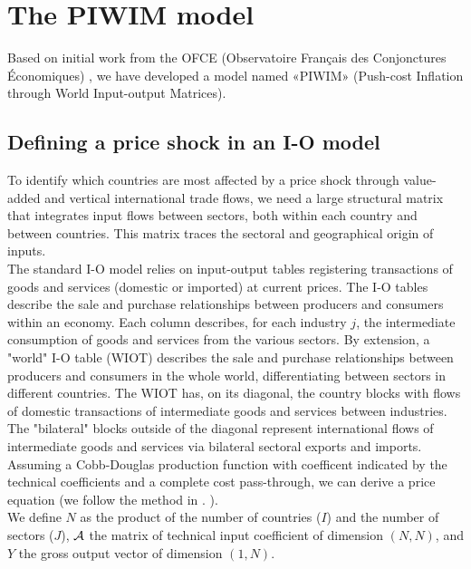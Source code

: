 \documentclass[11pt,a4paper]{article}
\begin{document}
\section{The PIWIM model }
\label{sec:metho}

Based on initial work from the OFCE (Observatoire Français des Conjonctures Économiques) \cite{Cochard2016}, we have developed a model named «PIWIM» (Push-cost Inflation through World Input-output Matrices). 

\subsection{Defining a price shock in an I-O model}\label{subsec:ioprice}
To identify which countries are most affected by a price shock through value-added and vertical international trade flows, we need a large structural matrix that integrates input flows between sectors, both within each country and between countries.
This matrix traces the sectoral and geographical origin of inputs. \\
The standard I-O model relies on input-output tables registering transactions of goods and services (domestic or imported) at current prices. The I-O tables describe the sale and purchase relationships between producers and consumers within an economy. Each column describes, for each industry $j$, the intermediate consumption of goods and services from the various sectors.
By extension, a "world" I-O table (WIOT) describes the sale and purchase relationships between producers and consumers in the whole world, differentiating between sectors in different countries.
The WIOT has, on its diagonal, the country blocks with flows of domestic transactions of intermediate goods and services between industries.
The "bilateral" blocks outside of the diagonal represent international flows of intermediate goods and services via bilateral sectoral exports and imports. \\
Assuming a Cobb-Douglas production function with coefficent indicated by the technical coefficients and a complete cost pass-through, we can derive a price equation (we follow the method in \citep{DeSoyres2018}. ).\\
We define $N$ as the product of the number of countries ($I$) and the number of sectors ($J$), $\cal A$ the matrix of technical input coefficient of dimension $(N, N)$, and $Y$ the gross output vector of dimension $(1, N)$. \\
\end{document}
